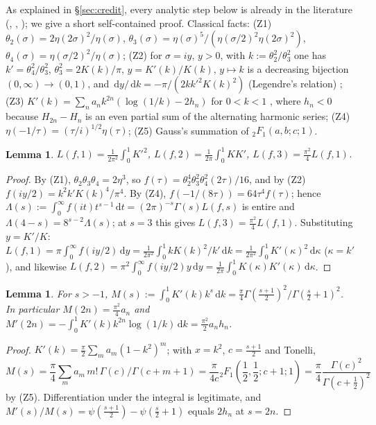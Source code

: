 \documentclass[11pt]{amsart}
\newtheorem{lemma}[theorem]{Lemma}
\theoremstyle{definition}
\theoremstyle{remark}
\numberwithin{equation}{section}
\newcommand{\dd}{\,\mathrm{d}}
\begin{document}
As explained in \S\ref{sec:credit}, every analytic step below is already in the literature (\cite[(30), (31)]{RWZ}, \cite{BSW}, \cite[Remarks~2, 5]{Zud}); we give a short self-contained proof. Classical facts: (Z1) $\theta_2(\sigma)=2\eta(2\sigma)^2/\eta(\sigma)$, $\theta_3(\sigma)=\eta(\sigma)^5/(\eta(\sigma/2)^2\eta(2\sigma)^2)$, $\theta_4(\sigma)=\eta(\sigma/2)^2/\eta(\sigma)$; (Z2) for $\sigma=iy$, $y>0$, with $k:=\theta_2^2/\theta_3^2$ one has $k'=\theta_4^2/\theta_3^2$, $\theta_3^2=2K(k)/\pi$, $y=K'(k)/K(k)$, $y\mapsto k$ is a decreasing bijection $(0,\infty)\to(0,1)$, and $\dd y/\dd k=-\pi/(2kk'^2K(k)^2)$ (Legendre's relation) \cite[ch.~2]{BB}; (Z3) $K'(k)=\sum_na_nk^{2n}(\log(1/k)-2h_n)$ for $0<k<1$ \cite[19.12.1]{DLMF}, where $h_n<0$ because $H_{2n}-H_n$ is an even partial sum of the alternating harmonic series; (Z4) $\eta(-1/\tau)=(\tau/i)^{1/2}\eta(\tau)$; (Z5) Gauss's summation of ${}_2F_1(a,b;c;1)$.

\begin{lemma}\label{lem:Lmoments}
$L(f,1)=\frac1{2\pi^2}\int_0^1K'^2$, $L(f,2)=\frac1{2\pi}\int_0^1KK'$, $L(f,3)=\frac{\pi^2}4L(f,1)$.
\end{lemma}
\begin{proof}
By (Z1), $\theta_2\theta_3\theta_4=2\eta^3$, so $f(\tau)=\theta_2^4\theta_3^2\theta_4^2(2\tau)/16$, and by (Z2) $f(iy/2)=k^2k'K(k)^4/\pi^4$. By (Z4), $f(-1/(8\tau))=64\tau^4f(\tau)$; hence $\Lambda(s):=\int_0^\infty f(it)t^{s-1}\dd t=(2\pi)^{-s}\Gamma(s)L(f,s)$ is entire and $\Lambda(4-s)=8^{s-2}\Lambda(s)$; at $s=3$ this gives $L(f,3)=\frac{\pi^2}4L(f,1)$. Substituting $y=K'/K$:
$L(f,1)=\pi\int_0^\infty f(iy/2)\dd y=\frac1{2\pi^2}\int_0^1kK(k)^2/k'\dd k=\frac1{2\pi^2}\int_0^1K'(\kappa)^2\dd\kappa$ ($\kappa=k'$), and likewise $L(f,2)=\pi^2\int_0^\infty f(iy/2)y\dd y=\frac1{2\pi}\int_0^1K(\kappa)K'(\kappa)\dd\kappa$.
\end{proof}

\begin{lemma}\label{lem:Kmoments}
For $s>-1$, $M(s):=\int_0^1K'(k)k^s\dd k=\frac\pi4\Gamma(\frac{s+1}2)^2/\Gamma(\frac s2+1)^2$. In particular $M(2n)=\frac{\pi^2}4a_n$ and $M'(2n)=-\int_0^1K'(k)k^{2n}\log(1/k)\dd k=\frac{\pi^2}2a_nh_n$.
\end{lemma}
\begin{proof}
$K'(k)=\frac\pi2\sum_ma_m(1-k^2)^m$; with $x=k^2$, $c=\frac{s+1}2$ and Tonelli,
\[M(s)=\frac\pi4\sum_ma_m\,m!\,\Gamma(c)/\Gamma(c+m+1)=\frac\pi{4c}{}_2F_1(\frac12,\frac12;c+1;1)=\frac\pi4\frac{\Gamma(c)^2}{\Gamma(c+\frac12)^2}\]
by (Z5). Differentiation under the integral is legitimate, and $M'(s)/M(s)=\psi(\frac{s+1}2)-\psi(\frac s2+1)$ equals $2h_n$ at $s=2n$.
\end{proof}
\end{document}
